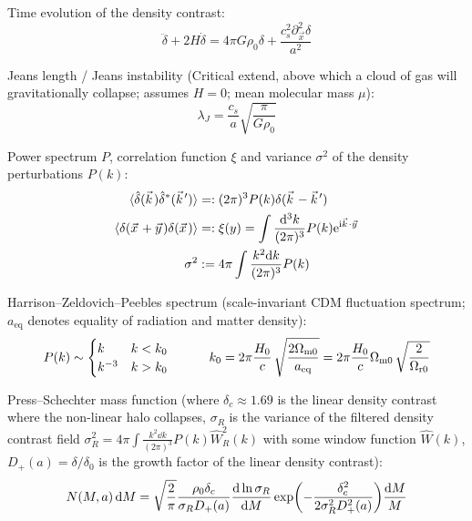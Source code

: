 		\noindent
		Time evolution of the density contrast:
		\begin{equation}
			\ddot{\delta} + 2 H \dot{\delta} = 4 \pi G \rho_0 \delta + \frac{c_s^2 \partial_{\vec{x}}^2 \delta}{a^2}
		\end{equation}

		\noindent
		Jeans length / Jeans instability (Critical extend, above which a cloud of gas will gravitationally collapse; assumes $H=0$; mean molecular mass $\mu$):
		\begin{equation}
			\lambda_J = \frac{c_s}{a} \sqrt{\frac{\pi}{G \rho_0}}
		\end{equation}

		\noindent
		Power spectrum $P$, correlation function $\xi$ and variance $\sigma^2$ of the density perturbations $P(k)$:
		\begin{align}
			\avg{\hat{\delta}(\vec{k}) \hat{\delta}^{*}(\vec{k}')} &=: (2\pi)^3 P(k) \delta (\vec{k}-\vec{k}') \\
			\avg{\delta(\vec{x} + \vec{y}) \delta(\vec{x})} &=: \xi(y) = \int \frac{\dd^3 k}{(2\pi)^3} P(k) \ex^{\i \vec{k} \cdot \vec{y}}\\
			\sigma^2 &:= 4\pi\int \frac{k^2 \dd k}{(2 \pi)^3} P(k)
		\end{align}

		\noindent
		Harrison--Zeldovich--Peebles spectrum (scale-invariant CDM fluctuation spectrum; $a_{\text{eq}}$ denotes equality of radiation and matter density):
		\begin{equation}
			P(k) \sim 
			\begin{cases}
				k & k < k_0\\k^{-3} & k > k_0
			\end{cases}
			\hspace{30pt}
			k_0 = 2\pi{\frac{H_{0}}{c}}\,{\sqrt{\frac{2\Omega_{\mathrm{m0}}}{a_{\mathrm{eq}}}}}=2\pi{\frac{H_{0}}{c}}\Omega_{\mathrm{m0}}\,{\sqrt{\frac{2}{\Omega_{\mathrm{r0}}}}}
		\end{equation}

		\noindent
		Press--Schechter mass function (where $\delta_c \approx 1.69$ is the linear density contrast where the non-linear halo collapses, $\sigma_R$ is the variance of the filtered density contrast field $\sigma_R^2 = 4\pi\int\frac{k^2 \dd k}{(2\pi)^3} P(k) \hat{W}_R^2(k)$ with some window function $\hat{W}(k)$, $D_+(a) = \delta/\delta_0$ is the growth factor of the linear density contrast):
		\begin{equation}
			N(M,a) \,\dd M = \sqrt{\frac{2}{\pi}} \frac{\rho_0 \delta_c}{\sigma_R D_{+}(a)} \dv{\ln\sigma_R}{M} \exp(-\frac{\delta_c^2}{2 \sigma_R^2 D_{+}^2(a)}) \frac{\dd M}{M}
		\end{equation}

